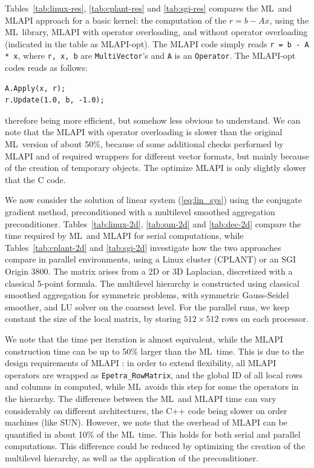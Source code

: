 \documentclass{article}[11pt]
\newcommand{\ML}     {{\sc ML}}
\newcommand{\MLAPI}  {{\sc MLAPI }}
\newcommand{\mlapi}  {{\sc MLAPI }}
\newcommand{\MLAPIns}  {{\sc MLAPI}}
\begin{document}
Tables~\ref{tab:linux-res}, \ref{tab:cplant-res}  and \ref{tab:sgi-res}
compares the \ML\ and \MLAPI approach for a basic kernel: the computation of
the $r = b - A x$, using the \ML\ library, \MLAPI with 
operator overloading, and without operator overloading 
(indicated in the table as \MLAPIns-opt). The \MLAPI code simply reads
{\tt r = b - A * x}, where {\tt r, x, b} are {\tt MultiVector}'s 
and {\tt A} is an {\tt Operator}. The \MLAPIns-opt codes reads
as follows:
\begin{verbatim}
A.Apply(x, r);
r.Update(1.0, b, -1.0);
\end{verbatim}
therefore being more efficient, but somehow less obvious to understand.
We can note that the \MLAPI with operator overloading is slower than the
original \ML\ version of about 50\%, because of some
additional checks performed by \MLAPI and of required wrappers for different vector
formats, but mainly because of the creation of temporary objects. The
optimize \MLAPI is only slightly slower that the C code. 

\smallskip

We now consider the solution of linear system (\ref{eq:lin_sys}) using the
conjugate gradient method, preconditioned with a multilevel smoothed
aggregation preconditioner.
Tables~\ref{tab:linux-2d}, \ref{tab:sun-2d} and
\ref{tab:dec-2d} compare the time required by \ML\ and \MLAPI for serial
computations, while Tables~\ref{tab:cplant-2d} and \ref{tab:sgi-2d}
investigate how the two approaches compare in parallel environments, using a
Linux cluster (CPLANT) or an SGI Origin 3800.  The matrix arises from a 2D or
3D Laplacian, discretized with a classical 5-point formula.  The multilevel
hierarchy is constructed using classical smoothed aggregation for symmetric
problems, with symmetric Gauss-Seidel smoother, and LU solver on the coarsest
level.  For the parallel runs, we keep constant the size of the local matrix, by
storing $512 \times 512$ rows on each processor. 

We note that the time per iteration is almost equivalent, while the
\mlapi construction time can be up to 50\% larger than the \ML\ time. This is
due to the design requirements of \MLAPI: in order to extend flexibility, all
\MLAPI operators are wrapped as {\tt Epetra\_RowMatrix}, and the global ID of
all local rows and columns in computed, while \ML\ avoids this step for some the
operators in the hierarchy. The difference between the \ML\ and \MLAPI time can vary considerably
on different architectures, the C++ code being slower on order machines 
(like SUN).
However, we note that the overhead of \mlapi 
can be quantified in about 10\%
of the \ML\ time. This holds for both serial and parallel computations. This
difference could be reduced by optimizing the creation of the multilevel
hierarchy, as well as the application of the preconditioner.
\end{document}
